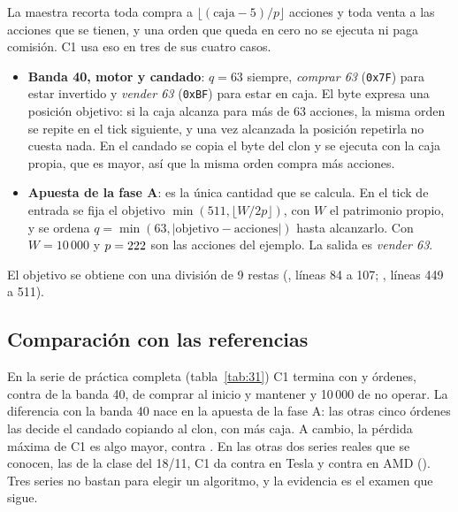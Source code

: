 La maestra recorta toda compra a $\lfloor (\text{caja} - 5)/p \rfloor$ acciones y toda venta a las acciones que se tienen, y una orden que queda en cero no se ejecuta ni paga comisión. C1 usa eso en tres de sus cuatro casos.
\begin{itemize}
  \item \textbf{Banda 40, motor y candado}: $q = 63$ siempre, \emph{comprar 63} (\texttt{0x7F}) para estar invertido y \emph{vender 63} (\texttt{0xBF}) para estar en caja. El byte expresa una posición objetivo: si la caja alcanza para más de 63 acciones, la misma orden se repite en el tick siguiente, y una vez alcanzada la posición repetirla no cuesta nada. En el candado se copia el byte del clon y se ejecuta con la caja propia, que es mayor, así que la misma orden compra más acciones.
  \item \textbf{Apuesta de la fase A}: es la única cantidad que se calcula. En el tick de entrada se fija el objetivo $\min(511, \lfloor W / 2p \rfloor)$, con $W$ el patrimonio propio, y se ordena $q = \min(63, |\text{objetivo} - \text{acciones}|)$ hasta alcanzarlo. Con $W = 10\,000$ y $p = 222$ son las \ctresApuestaAcciones{} acciones del ejemplo. La salida es \emph{vender 63}.
\end{itemize}
El objetivo se obtiene con una división de 9 restas (, líneas 84 a 107; , líneas 449 a 511).

\subsection{Comparación con las referencias}

\begin{table}[H]\centering
\caption{Patrimonio final, órdenes, comisiones y pérdida máxima en la serie de práctica.}\label{tab:31}

\end{table}

En la serie de práctica completa (tabla~\ref{tab:31}) C1 termina con \ctresPracticaW{} y \ctresPracticaOrdenes{} órdenes, contra \ctresPracticaBandaW{} de la banda 40, \ctresPracticaCymW{} de comprar al inicio y mantener y 10\,000 de no operar. La diferencia con la banda 40 nace en la apuesta de la fase A: las otras cinco órdenes las decide el candado copiando al clon, con más caja. A cambio, la pérdida máxima de C1 es algo mayor, \ctresPracticaPerdida{} contra \ctresPracticaBandaPerdida. En las otras dos series reales que se conocen, las de la clase del 18/11, C1 da \ctresTeslaW{} contra \ctresTeslaBandaW{} en Tesla y \ctresAmdW{} contra \ctresAmdBandaW{} en AMD (). Tres series no bastan para elegir un algoritmo, y la evidencia es el examen que sigue.

